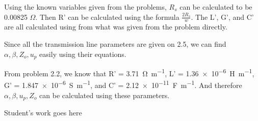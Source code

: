 \documentclass{article}
\begin{document}
\newpage


\vspace{\baselineskip}


\vspace*{1cm}
\noindent Using the known variables given from the problems, $R_s$ can be calculated to be 0.00825 $\Omega$. Then R' can be calculated using the formula $\frac{2R_s}{w}$. 
The L', G', and C' are all calculated using from what was given from the problem directly.

\newpage


\vspace{\baselineskip}


\vspace*{1cm}
\noindent Since all the transmission line parameters are given on 2.5, we can find $\alpha, \beta, Z_o, u_p$ easily using their equations.

\newpage


\vspace{\baselineskip}


\vspace*{1cm}
\noindent From problem 2.2, we know that R' = \SI{3.71}{\ohm.m^{-1}}, L' = \SI{1.36e-6}{H.m^{-1}}, G' = \SI{1.847e-6}{S.m^{-1}}, and C' = \SI{2.12e-11}{F.m^{-1}}. And therefore $\alpha, \beta, u_p, Z_o$ can be calculated using these parameters.


\newpage


\vspace{\baselineskip}


\vspace*{1cm}
\noindent Student's work goes here\\
\end{document}

